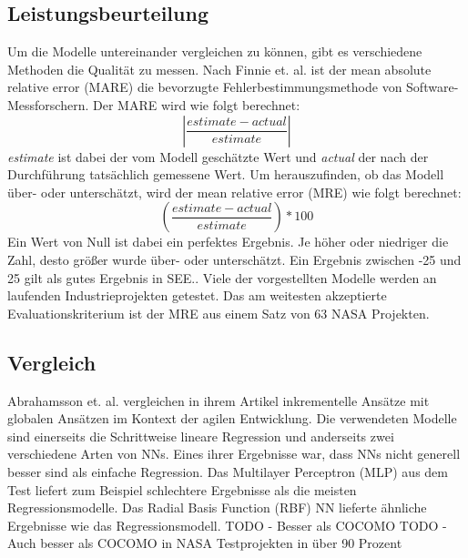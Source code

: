 \subsection{Leistungsbeurteilung}
Um die Modelle untereinander vergleichen zu können, gibt es verschiedene Methoden die Qualität zu messen. Nach Finnie et. al. ist der mean absolute relative error (MARE) die bevorzugte Fehlerbestimmungsmethode von Software-Messforschern. Der MARE wird wie folgt berechnet:
\begin{equation}
\left|\frac{estimate - actual}{estimate}\right|
\end{equation}
\textit{estimate} ist dabei der vom Modell geschätzte Wert und \textit{actual} der nach der Durchführung tatsächlich gemessene Wert. Um herauszufinden, ob das Modell über- oder unterschätzt, wird der mean relative error (MRE) wie folgt berechnet:
\begin{equation}
\left(\frac{estimate - actual}{estimate}\right)*100
\end{equation}
Ein Wert von Null ist dabei ein perfektes Ergebnis. Je höher oder niedriger die Zahl, desto größer wurde über- oder unterschätzt.\cite{Finnie1996} Ein Ergebnis zwischen -25 und 25 gilt als gutes Ergebnis in SEE.\cite{Abrahamsson2007}. Viele der vorgestellten Modelle werden an laufenden Industrieprojekten getestet. Das am weitesten akzeptierte Evaluationskriterium ist der MRE aus einem Satz von 63 NASA Projekten.\cite{Khalifelu2012}

\subsection{Vergleich}
Abrahamsson et. al. vergleichen in ihrem Artikel inkrementelle Ansätze mit globalen Ansätzen im Kontext der agilen Entwicklung. Die verwendeten Modelle sind einerseits die Schrittweise lineare Regression und anderseits zwei verschiedene Arten von NNs. Eines ihrer Ergebnisse war, dass NNs nicht generell besser sind als einfache Regression. Das Multilayer Perceptron (MLP) aus dem Test liefert zum Beispiel schlechtere Ergebnisse als die meisten Regressionsmodelle. Das Radial Basis Function (RBF) NN lieferte ähnliche Ergebnisse wie das Regressionsmodell.\cite{Abrahamsson2007}
TODO - Besser als COCOMO\cite{Khalifelu2012} %
TODO - Auch besser als COCOMO in NASA Testprojekten in über 90 Prozent\cite{Gharehchopogh2011} %